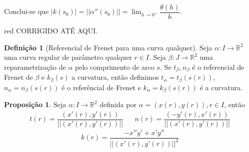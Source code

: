 \documentclass[12pt,leqno,twoside]{amsart}
\theoremstyle{definition}
\newtheorem{proposicao}{Proposição}[section]
\newtheorem{definicao}{Definição}[section]
\begin{document}
	Conclui-se que $|k(s_0)| = || \alpha''(s_0) || = \displaystyle\lim_{h\to 0^+} \dfrac{\theta(h)}{h}$.

\begin{color}{red}
CORRIGIDO ATÉ AQUI.
\end{color}

	\begin{definicao}[Referencial de Frenet para uma curva qualquer]
		Seja $\alpha: I \to \mathbb{R}^2$ uma curva regular de parâmetro qualquer $r\in I$. Seja $\beta:J \to \mathbb{R}^2$ uma reparametrização de $\alpha$ pelo comprimento de arco $s$. Se $t_{\beta}, n_{\beta}$ é o referencial de Frenet de $\beta$ e $k_\beta (s)$ a curvatura, então definimos $t_{\alpha} = t_{\beta}(s(r))$, $n_{\alpha} = n_{\beta}(s(r))$ é o referêncial de Frenet e  $k_{\alpha} = k_{\beta}(s(r))$ é a curvatura.
	\end{definicao}
	\begin{proposicao}
		Seja $\alpha:I\to \mathbb{R}^2$ definida por $\alpha = (x(r), y(r)), r\in I$,  então \begin{align*} t(r) = \dfrac{ (x'(r) ,y'(r) )}{||(x'(r) ,y'(r) ) || } && n(r) = \dfrac{ (-y'(r) ,x'(r) )}{||(x'(r) ,y'(r) ) || }\end{align*}
			$$k(r) = \dfrac{-x''y' +x'y''}{|| (x'(r),y'(r)) ||^3}$$
	\end{proposicao}
\end{document}
